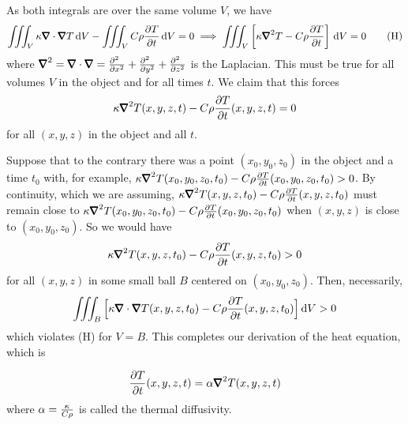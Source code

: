 As both integrals are over the same volume $V$, we have
\begin{equation}
\tripInt_{V} \ka\vnabla\cdot\vnabla T\,\dee{V}
-\tripInt_V C\rho\frac{\partial T}{\partial t}\,\dee{V}
=0
\implies 
\tripInt_{V} \left[\ka\vnabla^2 T
          -C\rho\frac{\partial T}{\partial t}\right]\,\dee{V}=0
\tag{H}\end{equation}
where $\vnabla^2=\vnabla\cdot\vnabla=\frac{\partial^2\hfill}{\partial x^2}+
\frac{\partial^2\hfill}{\partial y^2}+\frac{\partial^2\hfill}{\partial z^2}$
is the Laplacian.
This must be true for all volumes $V$ in the object and for all times $t$. We
claim that this forces 
\begin{equation*}
\ka\vnabla^2 T(x,y,z,t)-C\rho\frac{\partial T}{\partial t}(x,y,z,t)=0
\end{equation*}
for all $(x,y,z)$ in the object and all $t$.

Suppose that to the contrary there was a point $(x_0,y_0,z_0)$ in the object
and a time $t_0$ with, for example,
$\ka\vnabla^2 T(x_0,y_0,z_0,t_0)
   -C\rho\frac{\partial T}{\partial t}(x_0,y_0,z_0,t_0)>0$. 
By continuity, which we are assuming, $\ka\vnabla^2 T(x,y,z,t_0)
   -C\rho\frac{\partial T}{\partial t}(x,y,z,t_0)$
must remain close to $\ka\vnabla^2 T(x_0,y_0,z_0,t_0)
   -C\rho\frac{\partial T}{\partial t}(x_0,y_0,z_0,t_0)$ when $(x,y,z)$ 
is close to $(x_0,y_0,z_0)$.
So we would have 
\begin{equation*}
\ka\vnabla^2 T(x,y,z,t_0)
-C\rho\frac{\partial T}{\partial t}(x,y,z,t_0)>0
\end{equation*}
for all $(x,y,z)$ in some small ball $B$ centered on $(x_0,y_0,z_0)$. 
Then, necessarily,
\begin{equation*}
\tripInt_{B} \Big[\ka\vnabla\cdot\vnabla T(x,y,z,t_0)
      -C\rho\frac{\partial T}{\partial t}(x,y,z,t_0)\Big]\,\dee{V}>0
\end{equation*}
which violates (H) for $V=B$.  This completes our derivation of the 
heat equation, which is
\begin{impeqn}\label{eqn:heat}
\begin{equation*}
\frac{\partial T}{\partial t}(x,y,z,t)
=\alpha \vnabla^2 T(x,y,z,t)
\end{equation*}
where $\alpha=\frac{\kappa}{C\rho}$ is called the thermal diffusivity.
\end{impeqn}


